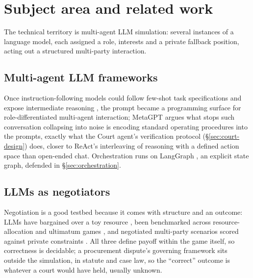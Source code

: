 \section{Subject area and related work}
\label{sec:related}

The technical territory is multi-agent LLM simulation: several instances of
a language model, each assigned a role, interests and a private fallback
position, acting out a structured multi-party interaction.

\subsection*{Multi-agent LLM frameworks}

Once instruction-following models could follow few-shot task specifications
\cite{brown2020language} and expose intermediate reasoning \cite{wei2022chain},
the prompt became a programming surface for role-differentiated multi-agent
interaction; MetaGPT \cite{hong2024metagpt} argues what stops such conversation
collapsing into noise is encoding standard operating procedures into the
prompts, exactly what the Court agent's verification protocol
(\S\ref{sec:court-design}) does, closer to ReAct's interleaving of reasoning
with a defined action space \cite{yao2023react} than open-ended chat.
Orchestration runs on LangGraph \cite{langgraph}, an explicit state graph,
defended in \S\ref{sec:orchestration}.

\subsection*{LLMs as negotiators}

Negotiation is a good testbed because it comes with structure and an outcome:
LLMs have bargained over a toy resource \cite{fu2023negotiation}, been
benchmarked across resource-allocation and ultimatum games
\cite{bianchi2024negotiation}, and negotiated multi-party scenarios scored
against private constraints \cite{abdelnabi2024negotiation}. All three define
payoff within the game itself, so correctness is decidable; a procurement
dispute's governing framework sits outside the simulation, in statute and
case law, so the ``correct'' outcome is whatever a court would have held,
usually unknown.

